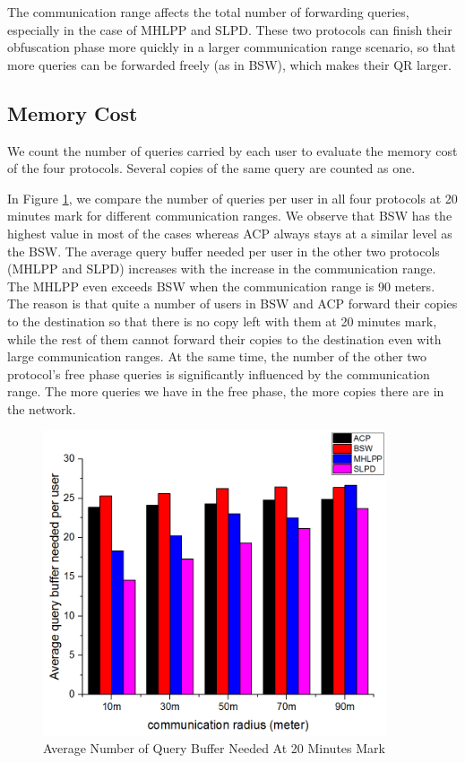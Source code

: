 The communication range affects the total number of forwarding queries, especially in the case of MHLPP and SLPD. These two protocols can finish their obfuscation phase more quickly in a larger communication range scenario, so that more queries can be forwarded freely (as in BSW), which makes their QR larger.

\subsection{ Memory Cost}

\noindent We count the number of queries carried by each user to evaluate the memory cost of the four protocols. Several copies of the same query are counted as one.

In Figure \ref{fig:F419AverageQueryBufferNeededAt20Minutes}, we compare the number of queries per user in all four protocols at 20 minutes mark for different communication ranges. We observe that BSW has the highest value in most of the cases whereas ACP always stays at a similar level as the BSW. The average query buffer needed per user in the other two protocols (MHLPP and SLPD) increases with the increase in the communication range. The MHLPP even exceeds BSW when the communication range is 90 meters. The reason is that quite a number of users in BSW and ACP forward their copies to the destination so that there is no copy left with them at 20 minutes mark, while the rest of them cannot forward their copies to the destination even with large communication ranges. At the same time, the number of the other two protocol's free phase queries is significantly influenced by the communication range. The more queries we have in the free phase, the more copies there are in the network.

\begin{figure} [hbtp]
  \centering 
  \includegraphics[width=4.0in]{figures/F419AverageQueryBufferNeededAt20Minutes.png}
  \caption{Average Number of Query Buffer Needed At 20 Minutes Mark} 
  \label{fig:F419AverageQueryBufferNeededAt20Minutes} %
\end{figure}

